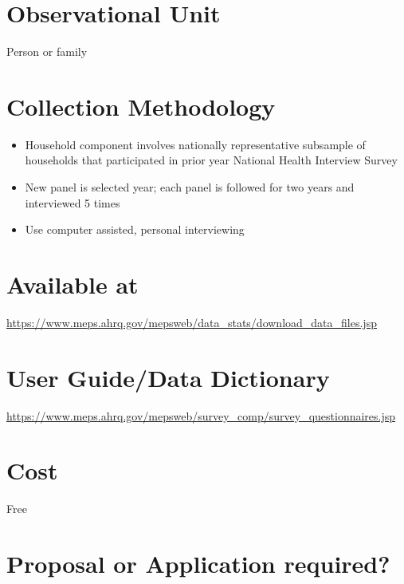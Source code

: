 \documentclass[
]{book}
\providecommand{\tightlist}{%
  \setlength{\itemsep}{0pt}\setlength{\parskip}{0pt}}
\begin{document}
\hypertarget{observational-unit-37}{%
\section{Observational Unit}\label{observational-unit-37}}

Person or family

\hypertarget{collection-methodology-37}{%
\section{Collection Methodology}\label{collection-methodology-37}}

\begin{itemize}
\tightlist
\item
  Household component involves nationally representative subsample of households that participated in prior year National Health Interview Survey
\item
  New panel is selected year; each panel is followed for two years and interviewed 5 times
\item
  Use computer assisted, personal interviewing
\end{itemize}

\hypertarget{available-at-37}{%
\section{Available at}\label{available-at-37}}

\url{https://www.meps.ahrq.gov/mepsweb/data_stats/download_data_files.jsp}

\hypertarget{user-guidedata-dictionary-37}{%
\section{User Guide/Data Dictionary}\label{user-guidedata-dictionary-37}}

\url{https://www.meps.ahrq.gov/mepsweb/survey_comp/survey_questionnaires.jsp}

\hypertarget{cost-37}{%
\section{Cost}\label{cost-37}}

Free

\hypertarget{proposal-or-application-required-37}{%
\section{Proposal or Application required?}\label{proposal-or-application-required-37}}
\end{document}

